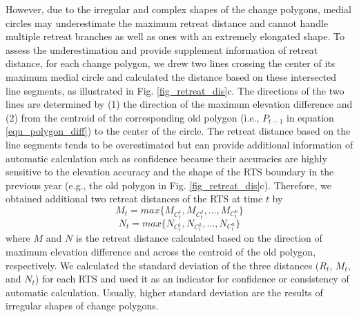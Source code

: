 \documentclass[authoryear,preprint,review,12pt]{elsarticle}
\begin{document}
However, due to the irregular and complex shapes of the change polygons, medial circles may underestimate the maximum retreat distance and cannot handle multiple retreat branches as well as ones with an extremely elongated shape.
To assess the underestimation and provide supplement information of retreat distance, for each change polygon, we drew two lines crossing the center of its maximum medial circle and calculated the distance based on these intersected line segments, as illustrated in Fig. \ref{fig_retreat_dis}c. 
The directions of the two lines are determined by (1) the direction of the maximum elevation difference and (2) from the centroid of the corresponding old polygon (i.e., $P_{t-1}$ in equation \ref{equ_polygon_diff}) to the center of the circle. 
The retreat distance based on the line segments tends to be overestimated but can provide additional information of automatic calculation such as confidence because their accuracies are highly sensitive to the elevation accuracy and the shape of the RTS boundary in the previous year (e.g., the old polygon in Fig. \ref{fig_retreat_dis}c). 
Therefore, we obtained additional two retreat distances of the RTS at time $t$ by
\begin{equation}
M_t = max\{M_{C_t^1},M_{C_t^2},...,M_{C_t^n}\}
\label{equ_dis_slope}
\end{equation}
\begin{equation}
N_t = max\{N_{C_t^1},N_{C_t^2},...,N_{C_t^n}\}
\label{equ_dis_centroid}
\end{equation}
where $M$ and $N$ is the retreat distance calculated based on the direction of maximum elevation difference and across the centroid of the old polygon, respectively.
We calculated the standard deviation of the three distances ($R_t$, $M_t$, and $N_t$) for each RTS and used it as an indicator for confidence or consistency of automatic calculation. 
Usually, higher standard deviation are the results of irregular shapes of change polygons.
\end{document}
